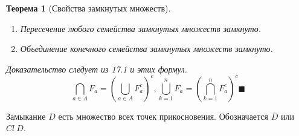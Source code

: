 \documentclass[12pt,a4paper]{article}
\newtheorem*{theorem*}{Теорема}
\begin{document}
\begin{theorem*}[Свойства замкнутых множеств]
\label{17.2}
\ 
\begin{enumerate}
\item Пересечение любого семейства замкнутых множеств замкнуто.
\item Объединение конечного семейства замкнутых множеств замкнуто.
\end{enumerate}

Доказательство следует из 17.1 и этих формул.
$$
\bigcap\limits_{a\in A}{F_a} = {\left( \bigcup\limits_{a\in A}{F_{a}^{c} }\right)}^{c}, \bigcup\limits_{k=1}^{n}{F_a} = {\left( \bigcap\limits_{k=1}^{n}{F_{a}^{c} }\right)}^{c} \blacksquare
$$
\end{theorem*}

Замыкание $D$ есть множество всех точек прикосновения. Обозначается $\overline{D}$ или $Cl\ D$.
\end{document}
